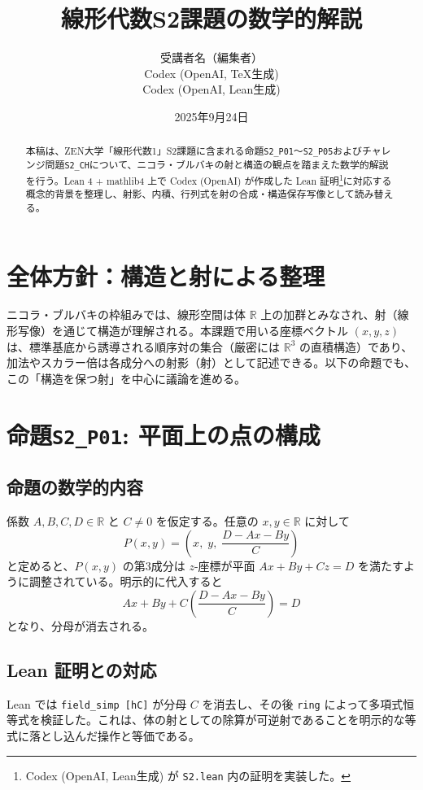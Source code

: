 \documentclass{ltjsarticle}
\title{線形代数S2課題の数学的解説}
\author{受講者名（編集者）\\Codex (OpenAI, TeX生成)\\Codex (OpenAI, Lean生成)}
\date{2025年9月24日}
\begin{document}
\maketitle

\begin{abstract}
本稿は、ZEN大学「線形代数1」S2課題に含まれる命題\texttt{S2\_P01}〜\texttt{S2\_P05}およびチャレンジ問題\texttt{S2\_CH}について、ニコラ・ブルバキの射と構造の観点を踏まえた数学的解説を行う。Lean 4 + mathlib4 上で Codex (OpenAI) が作成した Lean 証明\footnote{Codex (OpenAI, Lean生成) が \texttt{S2.lean} 内の証明を実装した。}に対応する概念的背景を整理し、射影、内積、行列式を射の合成・構造保存写像として読み替える。
\end{abstract}

\tableofcontents

\section{全体方針：構造と射による整理}
ニコラ・ブルバキの枠組みでは、線形空間は体 $\mathbb{R}$ 上の加群とみなされ、射（線形写像）を通じて構造が理解される。本課題で用いる座標ベクトル $(x, y, z)$ は、標準基底から誘導される順序対の集合（厳密には $\mathbb{R}^3$ の直積構造）であり、加法やスカラー倍は各成分への射影（射）として記述できる。以下の命題でも、この「構造を保つ射」を中心に議論を進める。

\section{命題\texttt{S2\_P01}: 平面上の点の構成}
\subsection{命題の数学的内容}
係数 $A,B,C,D \in \mathbb{R}$ と $C \neq 0$ を仮定する。任意の $x,y \in \mathbb{R}$ に対して
\[
P(x, y) = \left(x,\; y,\; \frac{D - Ax - By}{C}\right)
\]
と定めると、$P(x,y)$ の第3成分は $z$-座標が平面 $Ax + By + Cz = D$ を満たすように調整されている。明示的に代入すると
\[
Ax + By + C\left(\frac{D - Ax - By}{C}\right) = D
\]
となり、分母が消去される。

\subsection{Lean 証明との対応}
Lean では \verb|field_simp [hC]| が分母 $C$ を消去し、その後 \verb|ring| によって多項式恒等式を検証した。これは、体の射としての除算が可逆射であることを明示的な等式に落とし込んだ操作と等価である。
\end{document}
